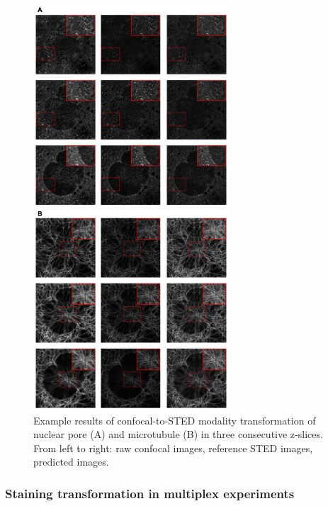 \begin{figure}
\hypertarget{fig:modality}{%
\centering
\includegraphics[width=0.65\textwidth,height=0.7\textheight]{images/modality.png}
\caption{Example results of confocal-to-STED modality transformation of nuclear pore (A) and microtubule (B) in three consecutive z-slices. From left to right: raw confocal images, reference STED images, predicted images.}\label{fig:modality}
}
\end{figure}

\hypertarget{staining-transformation-in-multiplex-experiments}{%
\subsubsection{Staining transformation in multiplex experiments}\label{staining-transformation-in-multiplex-experiments}}

